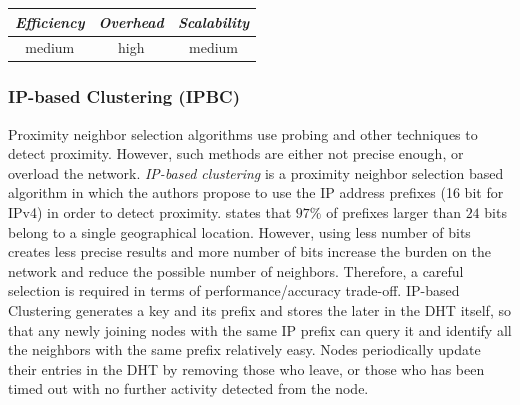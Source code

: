 %
%
%

\begin{center}
\begin{tabular}{ccc}
\emph{Efficiency} & \emph{Overhead} & \emph{Scalability} \\
\hline
medium &
high &
medium
\end{tabular}
\end{center}

\subsubsection{IP-based Clustering (IPBC)}
Proximity neighbor selection algorithms use probing and other techniques to
detect proximity. However, such methods are either not precise enough, or
overload the network. \emph{IP-based clustering} \cite{KM2007} is a proximity
neighbor selection based algorithm in which the authors propose to use the IP
address prefixes (16 bit for IPv4) in order to detect proximity.
\cite{freedman_iploc_2005} states that $97\%$ of prefixes larger than $24$ bits
belong to a single geographical location. However, using less number of bits
creates less precise results and more number of bits increase the burden on the
network and reduce the possible number of neighbors. Therefore, a careful
selection is required in terms of performance/accuracy trade-off. IP-based
Clustering generates a key and its prefix and stores the later in the DHT
itself, so that any newly joining nodes with the same IP prefix can query it and
identify all the neighbors with the same prefix relatively easy. Nodes
periodically update their entries in the DHT by removing those who leave, or
those who has been timed out with no further activity detected from the node.

